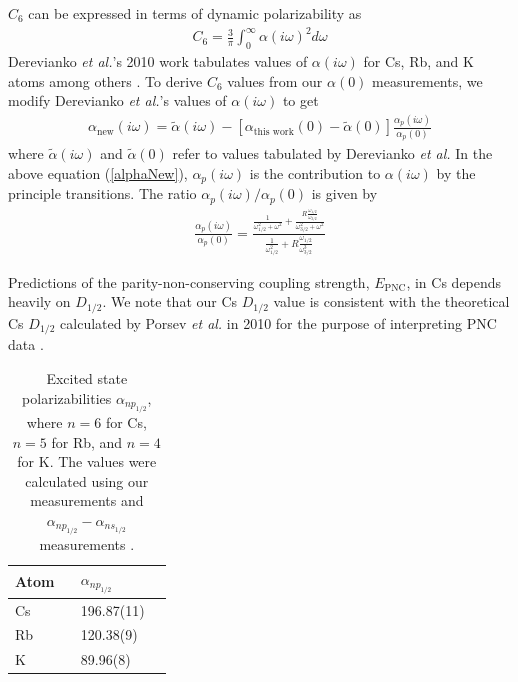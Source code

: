 \documentclass[twocolumn,prl,showpacs,superscriptaddress,longbibliography]{revtex4-1}   %
\newcommand{\sspace}{$\enspace$}
\newcommand{\etal}{\textit{et al.}}
\newcommand{\etalspace}{\textit{et al. }}
\begin{document}
$C_6$ can be expressed in terms of dynamic polarizability as
\begin{align}
	C_6 = \frac{3}{\pi} \int_0^{\infty} \alpha(i\omega)^2 d\omega
	\label{C6fromPol}
\end{align}
Derevianko \etal's 2010 work tabulates values of $\alpha(i\omega)$ for Cs, Rb, and K atoms among others \cite{Derevianko2010}. To derive $C_6$ values from our $\alpha(0)$ measurements, we modify Derevianko \etal's values of $\alpha(i\omega)$ to get
\begin{align}
	\alpha_{\mathrm{new}}(i\omega) =
	\tilde{\alpha}(i\omega) -
	\left[\alpha_{\textrm{this work}}(0) - \tilde{\alpha}(0)\right]
	\frac{\alpha_p(i\omega)}{\alpha_p(0)}
	\label{alphaNew}
\end{align}
where $\tilde{\alpha}(i\omega)$ and $\tilde{\alpha}(0)$ refer to values tabulated by Derevianko \etalspace
In the above equation (\ref{alphaNew}), $\alpha_p(i\omega)$ is the contribution to $\alpha(i\omega)$ by the principle transitions. The ratio $\alpha_p(i\omega)/\alpha_p(0)$ is given by
\begin{align}
	\frac{\alpha_p(i\omega)}{\alpha_p(0)} = \frac
	{
		\frac{1}{\omega_{1/2}^2+\omega^2} + \frac{R\frac{\omega_{1/2}}{\omega_{3/2}}}{\omega_{3/2}^2+\omega^2}
	}
	{
		\frac{1}{\omega_{1/2}^2} + R\frac{\omega_{1/2}}{\omega^3_{3/2}}
	}
	\label{polPRatio}
\end{align}

Predictions of the parity-non-conserving coupling strength, $E_{\mathrm{PNC}}$, in Cs depends heavily on $D_{1/2}$.
We note that our Cs $D_{1/2}$ value is consistent with the theoretical Cs $D_{1/2}$ calculated by Porsev \etalspace in 2010 for the purpose of interpreting PNC data \cite{Porsev2010}.

\begingroup
\begin{table}
\caption{\label{tablePolExcited}Excited state polarizabilities $\alpha_{np_{1/2}}$, where $n = 6$ for Cs, $n = 5$ for Rb, and $n = 4$ for K. The values were calculated using our measurements and $\alpha_{np_{1/2}} - \alpha_{ns_{1/2}}$ measurements \cite{Hunter1991,Miller1994}.}
\begin{center}
\begin{tabular}{l l l}
\hline\hline
Atom \sspace & $\alpha_{np_{1/2}}$ \\
\hline
Cs & 196.87(11) \\
Rb & 120.38(9) \\
K  & 89.96(8) \\
\hline\hline
\end{tabular}
\end{center}
\end{table}
\endgroup
\end{document}
